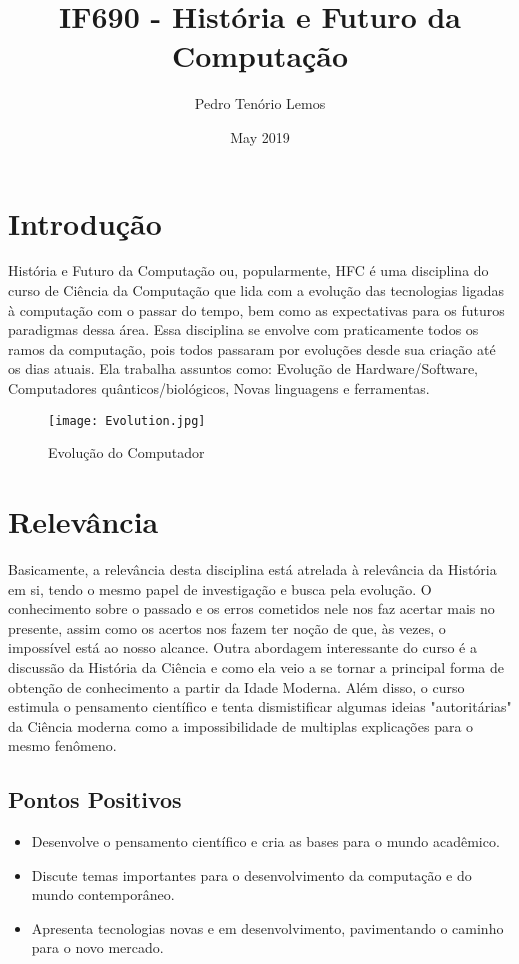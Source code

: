 \documentclass{article}
\title{IF690 - História e Futuro da Computação}
\author{Pedro Tenório Lemos}
\date{May 2019}
\begin{document}
\maketitle

\section{Introdução}

História e Futuro da Computação ou, popularmente, HFC é uma disciplina do curso de Ciência da Computação que lida com a evolução das tecnologias ligadas à computação com o passar do tempo, bem como as expectativas para os futuros paradigmas dessa área. \cite{cinwikiif690} Essa disciplina se envolve com praticamente todos os ramos da computação, pois todos passaram por evoluções desde sua criação até os dias atuais. Ela trabalha assuntos como: Evolução de Hardware/Software, Computadores quânticos/biológicos, Novas linguagens e ferramentas. \cite{cingradif690}

\begin{figure}[h!]
    \centering
    \texttt{[image: Evolution.jpg]}
    \caption{Evolução do Computador \cite{figura}}
    \label{fig:evolution}
\end{figure}

\section{Relevância}
Basicamente, a relevância desta disciplina está atrelada à relevância da História em si, tendo o mesmo papel de investigação e busca pela evolução. O conhecimento sobre o passado e os erros cometidos nele nos faz acertar mais no presente, assim como os acertos nos fazem ter noção de que, às vezes, o impossível está ao nosso alcance. \cite{hdccleuzio} Outra abordagem interessante do curso é a discussão da História da Ciência e como ela veio a se tornar a principal forma de obtenção de conhecimento a partir da Idade Moderna. Além disso, o curso estimula o pensamento científico e tenta dismistificar algumas ideias "autoritárias" da Ciência moderna como a impossibilidade de multiplas explicações para o mesmo fenômeno. \cite{ssrthomas}  

\subsection{Pontos Positivos}

\begin{itemize}
    \item Desenvolve o pensamento científico e cria as bases para o mundo acadêmico.
    \item Discute temas importantes para o desenvolvimento da computação e do mundo contemporâneo.
    \item Apresenta tecnologias novas e em desenvolvimento, pavimentando o caminho para o novo mercado.
\end{itemize}
\end{document}
